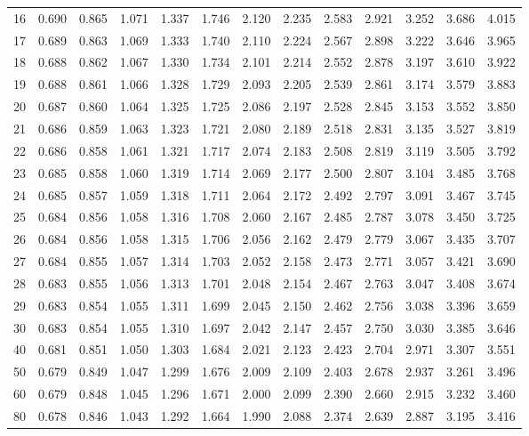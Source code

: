 \begin{table}[H]
\begin{tabular}{c|cccccccccccc}
16 & 0.690 & 0.865 & 1.071 & 1.337 & 1.746 & 2.120 & 2.235 & 2.583 & 2.921 & 3.252 & 3.686 & 4.015 \\
17 & 0.689 & 0.863 & 1.069 & 1.333 & 1.740 & 2.110 & 2.224 & 2.567 & 2.898 & 3.222 & 3.646 & 3.965 \\
18 & 0.688 & 0.862 & 1.067 & 1.330 & 1.734 & 2.101 & 2.214 & 2.552 & 2.878 & 3.197 & 3.610 & 3.922 \\
19 & 0.688 & 0.861 & 1.066 & 1.328 & 1.729 & 2.093 & 2.205 & 2.539 & 2.861 & 3.174 & 3.579 & 3.883 \\
20 & 0.687 & 0.860 & 1.064 & 1.325 & 1.725 & 2.086 & 2.197 & 2.528 & 2.845 & 3.153 & 3.552 & 3.850 \\
21 & 0.686 & 0.859 & 1.063 & 1.323 & 1.721 & 2.080 & 2.189 & 2.518 & 2.831 & 3.135 & 3.527 & 3.819 \\
22 & 0.686 & 0.858 & 1.061 & 1.321 & 1.717 & 2.074 & 2.183 & 2.508 & 2.819 & 3.119 & 3.505 & 3.792 \\
23 & 0.685 & 0.858 & 1.060 & 1.319 & 1.714 & 2.069 & 2.177 & 2.500 & 2.807 & 3.104 & 3.485 & 3.768 \\
24 & 0.685 & 0.857 & 1.059 & 1.318 & 1.711 & 2.064 & 2.172 & 2.492 & 2.797 & 3.091 & 3.467 & 3.745 \\
25 & 0.684 & 0.856 & 1.058 & 1.316 & 1.708 & 2.060 & 2.167 & 2.485 & 2.787 & 3.078 & 3.450 & 3.725 \\
26 & 0.684 & 0.856 & 1.058 & 1.315 & 1.706 & 2.056 & 2.162 & 2.479 & 2.779 & 3.067 & 3.435 & 3.707 \\
27 & 0.684 & 0.855 & 1.057 & 1.314 & 1.703 & 2.052 & 2.158 & 2.473 & 2.771 & 3.057 & 3.421 & 3.690 \\
28 & 0.683 & 0.855 & 1.056 & 1.313 & 1.701 & 2.048 & 2.154 & 2.467 & 2.763 & 3.047 & 3.408 & 3.674 \\
29 & 0.683 & 0.854 & 1.055 & 1.311 & 1.699 & 2.045 & 2.150 & 2.462 & 2.756 & 3.038 & 3.396 & 3.659 \\
30 & 0.683 & 0.854 & 1.055 & 1.310 & 1.697 & 2.042 & 2.147 & 2.457 & 2.750 & 3.030 & 3.385 & 3.646 \\
40 & 0.681 & 0.851 & 1.050 & 1.303 & 1.684 & 2.021 & 2.123 & 2.423 & 2.704 & 2.971 & 3.307 & 3.551 \\
50 & 0.679 & 0.849 & 1.047 & 1.299 & 1.676 & 2.009 & 2.109 & 2.403 & 2.678 & 2.937 & 3.261 & 3.496 \\
60 & 0.679 & 0.848 & 1.045 & 1.296 & 1.671 & 2.000 & 2.099 & 2.390 & 2.660 & 2.915 & 3.232 & 3.460 \\
80 & 0.678 & 0.846 & 1.043 & 1.292 & 1.664 & 1.990 & 2.088 & 2.374 & 2.639 & 2.887 & 3.195 & 3.416 \\

\end{tabular}
\end{table}
